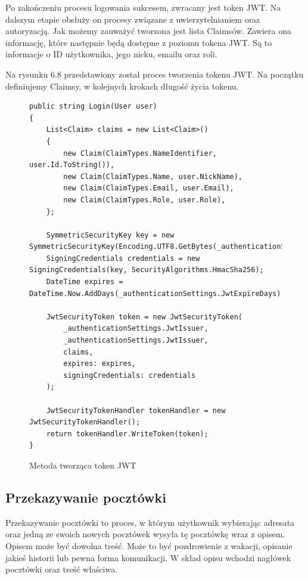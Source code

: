 \documentclass[a4paper,twoside,12pt]{book}
\begin{document}
Po zakończeniu procesu logowania sukcesem, zwracany jest token JWT. Na dalszym etapie obsłuży on procesy związane z uwierzytelnianiem oraz autoryzacją. Jak możemy zauważyć tworzona jest lista Claimsów. Zawiera ona informację, które następnie będą dostępne z poziomu tokena JWT. Są to informacje o ID użytkownika, jego nicku, emailu oraz roli.

Na rysunku 6.8 przedstawiony został proces tworzenia tokenu JWT. Na początku definiujemy Claimsy, w kolejnych krokach długość życia tokenu.
\begin{figure}[H]
\begin{lstlisting}
public string Login(User user)
{
    List<Claim> claims = new List<Claim>()
    {
        new Claim(ClaimTypes.NameIdentifier, user.Id.ToString()),
        new Claim(ClaimTypes.Name, user.NickName),
        new Claim(ClaimTypes.Email, user.Email),
        new Claim(ClaimTypes.Role, user.Role),
    };

    SymmetricSecurityKey key = new SymmetricSecurityKey(Encoding.UTF8.GetBytes(_authenticationSettings.JwtKey));
    SigningCredentials credentials = new SigningCredentials(key, SecurityAlgorithms.HmacSha256);
    DateTime expires = DateTime.Now.AddDays(_authenticationSettings.JwtExpireDays);

    JwtSecurityToken token = new JwtSecurityToken(
        _authenticationSettings.JwtIssuer,
        _authenticationSettings.JwtIssuer,
        claims,
        expires: expires,
        signingCredentials: credentials
    );

    JwtSecurityTokenHandler tokenHandler = new JwtSecurityTokenHandler();
    return tokenHandler.WriteToken(token);
}
\end{lstlisting}
\caption{Metoda tworząca token JWT}
\label{fig:pseudokod:listings}
\end{figure}

\subsection{Przekazywanie pocztówki}
Przekazywanie pocztówki to proces, w którym użytkownik wybierając adresata oraz jedną ze swoich nowych pocztówek wysyła tę pocztówkę wraz z opisem. Opisem może być dowolna treść. Może to być pozdrowienie z wakacji, opisanie jakieś historii lub pewna forma komunikacji. W skład opisu wchodzi nagłówek pocztówki oraz treść właściwa. 
\end{document}
